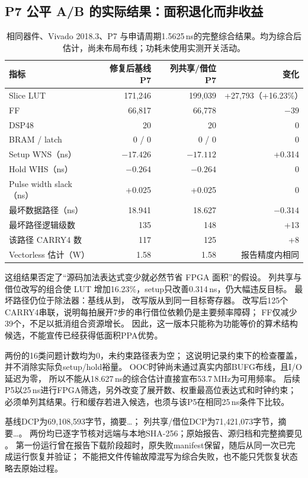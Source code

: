 \subsection{P7 公平 A/B 的实际结果：面积退化而非收益}
\begin{table}[H]\centering\small
\begin{tabular}{lrrr}\toprule
指标&修复后基线 P7&列共享/借位 P7&变化\\\midrule
Slice LUT&171,246&199,039&+27,793（+16.23\%）\\
FF&66,817&66,778&$-39$\\
DSP48&20&20&0\\
BRAM / latch&0 / 0&0 / 0&0\\
Setup WNS（ns）&$-17.426$&$-17.112$&+0.314\\
Hold WHS（ns）&$-0.264$&$-0.264$&0\\
Pulse width slack（ns）&+0.025&+0.025&0\\
最坏数据路径（ns）&18.941&18.627&$-0.314$\\
最坏路径逻辑级数&135&148&+13\\
该路径 CARRY4 数&117&125&+8\\
Vectorless 估计（W）&1.58&1.58&报告精度内相同\\\bottomrule
\end{tabular}
\caption{相同器件、Vivado 2018.3、P7 与申请周期1.5625\,ns的完整综合结果。均为综合后估计，尚未布局布线；功耗未使用实测开关活动。}
\end{table}

这组结果否定了“源码加法表达式变少就必然节省 FPGA 面积”的假设。
列共享与借位改写的组合使 LUT 增加16.23\%，setup只改善0.314\,ns，仍大幅违反目标。
最坏路径仍位于除法器：基线从到，
改写版从到同一目标寄存器。
改写后125个CARRY4串联，说明每拍展开7步的串行借位依赖仍是主要频率障碍；
FF仅减少39个，不足以抵消组合资源增长。
因此，这一版本只能称为功能等价的算术结构候选，不能宣传已经获得低面积PPA优势。

两份的16类问题计数均为0，未约束路径表为空；
这说明记录约束下的检查覆盖，并不消除实际负setup/hold裕量。
OOC时钟尚未通过真实内部BUFG布线，且I/O延迟为零，
所以不能从18.627\,ns的综合估计直接宣布53.7\,MHz为可用频率。
后续P5以25\,ns进行FPGA筛选，另外改变了展开数、权重最高位表达式和时钟约束；
必须单列其结果。行和缓存若进入候选，也须与该P5在相同25\,ns条件下比较。

基线DCP为69,108,593字节，摘要\ldots；
列共享/借位DCP为71,421,073字节，摘要\ldots。
两份均已逐字节核对远端与本地SHA-256；原始报告、源归档和完整摘要见
。
第一份运行曾在报告下载阶段超时，原失败manifest保留，随后从同一次已完成运行恢复并验证；
不能把文件传输故障混写为综合失败，也不能只凭恢复状态略去原始过程。
